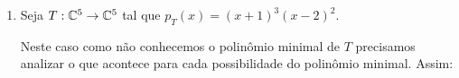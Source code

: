 \begin{exemplo}
\begin{enumerate}[label={\arabic*})]
\begin{solucao}
\[\begin{tabular}{ccc|c}
                         &  &  & 2
                    \end{tabular}
                \right].
            \]
            Se $r = 4$, ent\~ao
            \[
                [T_1]_{\mathcal{B}_1} = \left[\begin{tabular}{ccccc}
                         2 & 0 & 0 & 0\\
                         1 & 2 & 0 & 0\\
                         0 & 1 & 2 & 0\\
                         0 & 0 & 1 & 2
                    \end{tabular}
                \right].
            \]
            O operador $(T_2 - 3I_3)$ \'e nilpotente de {\'\i}ndice de nilpot\^encia $r \le 3$.

            Se $r = 1$, ent\~ao
            \[
                [T_2]_{\mathcal{B}_2} = \left[\begin{tabular}{ccc}
                     3 & 0 & 0\\
                     0 & 3 & 0\\
                     0 & 0 & 3
                \end{tabular}
                \right].
            \]
            Se $r = 2$, ent\~ao
            \[
                [T_1]_{\mathcal{B}_1} = \left[\begin{tabular}{cc|c}
                     3 & 0 & \\
                     1 & 3 & \\ \cline{1-3}
                     &  & 3
                 \end{tabular}
                \right].
            \]
            Se $r = 3$, ent\~ao
            \[
                [T_1]_{\mathcal{B}_1} = \left[\begin{tabular}{ccc}
                         3 & 0 & 0 \\
                         1 & 3 & 0 \\
                         0 & 1 & 3
                    \end{tabular}
                \right].
            \]
            Logo existem 15 poss{\'\i}veis formas de Jordan para $T$.
        \end{solucao}
        \item Seja $T : \mathbb{C}^5 \to \mathbb{C}^5$ tal que $p_T(x) = (x + 1)^3(x - 2)^2$.
        \begin{solucao}
            Neste caso como n\~ao conhecemos o polin\^omio minimal de $T$ precisamos analizar o que acontece para cada possibilidade do polin\^omio minimal. Assim:

\end{solucao}
\end{enumerate}
\end{exemplo}
